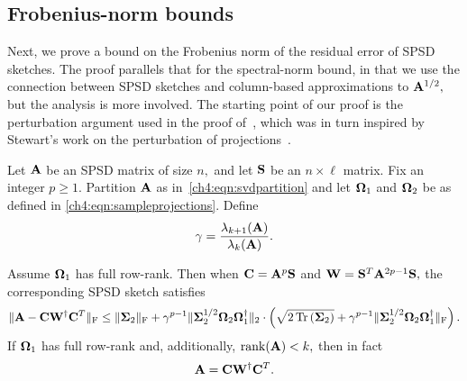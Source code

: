 \subsection{Frobenius-norm bounds}
\label{ch4:sxn:theory-det-frobenius}

Next, we prove a bound on the Frobenius norm of the 
residual error of SPSD sketches. The proof parallels that for the spectral-norm bound, in that we use the 
connection between SPSD sketches and column-based approximations to $\mathbf{A}^{1/2},$
but the analysis is more involved. The starting point of our proof is the
perturbation argument used in the proof of~\cite[Theorem 9.1]{HMT11}, which 
was in turn inspired by Stewart's work on the perturbation of 
projections~\cite{S77}.
%
\begin{thm}
Let $\mathbf{A}$ be an SPSD matrix of size $n,$ and let $\mathbf{S}$ be an $n \times
\ell$ matrix. Fix an integer $p \geq 1.$ Partition $\mathbf{A}$ as in~\eqref{ch4:eqn:svdpartition} and
let $\mathbf{\Omega}_1$ and $\mathbf{\Omega}_2$ be as defined in 
\eqref{ch4:eqn:sampleprojections}. Define
\[
 \gamma = \frac{\lambda_{k+1}(\mathbf{A})}{\lambda_k(\mathbf{A})}.
\]

Assume $\mathbf{\Omega}_1$ has full row-rank. Then when $\mathbf{C} = \mathbf{A}^p \mathbf{S}$ and $\mathbf{W} = \mathbf{S}^T\mathbf{A}^{2p-1} \mathbf{S},$
the corresponding SPSD sketch satisfies
\begin{equation*}
\|\mathbf{A} - \mathbf{C} \mathbf{W}^\dagger \mathbf{C}^T\|_{\mathrm{F}}
   \leq \|\mathbf{\Sigma}_2\|_{\mathrm{F}} +  \gamma^{p-1} \|\mathbf{\Sigma}_2^{1/2} \mathbf{\Omega}_2 \mathbf{\Omega}_1^\dagger\|_2 \cdot 
   \left(\sqrt{2 \operatorname{Tr}\left(\mathbf{\Sigma}_2\right)} + \gamma^{p-1} \|\mathbf{\Sigma}_2^{1/2} \mathbf{\Omega}_2 \mathbf{\Omega}_1^\dagger\|_{\mathrm{F}}\right).
\end{equation*} 
If $\mathbf{\Omega}_1$ has full row-rank and, additionally, $\mathrm{rank}(\mathbf{A}) < k,$ then in fact
\[
 \mathbf{A} = \mathbf{C}\mathbf{W}^\dagger \mathbf{C}^T.
\]
\label{ch4:thm:frobenius-deterministic-error}
\end{thm}

